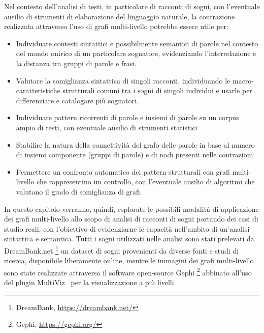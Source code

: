 Nel contesto dell'analisi di testi, in particolare di racconti di sogni, con l'eventuale ausilio di strumenti di
elaborazione del linguaggio naturale, la contrazione realizzata attraverso l'uso di grafi multi-livello potrebbe
essere utile per:
\begin{itemize}
    \item Individuare contesti sintattici e possibilmente semantici di parole nel contesto del mondo onirico
    di un particolare sognatore, evidenziando l'interrelazione e la distanza tra gruppi di parole e frasi.
    \item Valutare la somiglianza sintattica di singoli racconti, individuando le macro-caratteristiche
    strutturali comuni tra i sogni di singoli individui e usarle per differenziare e catalogare più sognatori.
    \item Individuare pattern ricorrenti di parole e insiemi di parole su un corpus ampio di testi, con
    eventuale ausilio di strumenti statistici
    \item Stabilire la natura della connettività del grafo delle parole in base al numero di insiemi componente
    (gruppi di parole) e di nodi presenti nelle contrazioni.
    \item Permettere un confronto automatico dei pattern strutturali con grafi multi-livello che rappresentino
    un controllo, con l'eventuale ausilio di algoritmi che valutano il grado di somiglianza di grafi.
\end{itemize}

In questo capitolo verranno, quindi, esplorate le possibili modalità di applicazione dei grafi multi-livello allo scopo
di analisi di racconti di sogni portando dei casi di studio reali, con l'obiettivo di evidenziarne le capacità
nell'ambito di un'analisi sintattica e semantica.
Tutti i sogni utilizzati nelle analisi sono stati prelevati da DreamBank.net \footnote{DreamBank, \url{https://dreambank.net/}}
un dataset di sogni provenienti da diverse fonti e studi di ricerca, disponibile liberamente online, mentre le
immagini dei grafi multi-livello sono state realizzate attraverso il software open-source Gephi \footnote{Gephi, \url{https://gephi.org/}}
abbinato all'uso del plugin MultiViz~\cite{s2022multivizgephipluginscalable} per la visualizzazione a più livelli.

\newpage

\newpage


